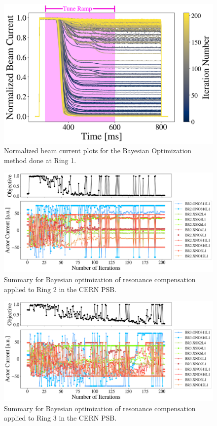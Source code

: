 \begin{figure}[H]
    \centering
    \includegraphics[width=\linewidth]{chapter5/i1_bo_commented.png}
    \caption{Normalized beam current plots for the Bayesian Optimization method done at Ring 1.}
    \label{fig:ibo}
\end{figure}

\begin{figure}[H]
    \centering
    \includegraphics[width=\linewidth]{chapter5/2023_05_02_R2_LHCramp_BayesOpt.png}
    \caption{Summary for Bayesian optimization of resonance compensation applied to Ring 2 in the CERN PSB.}
    \label{fig:bo1}
\end{figure}

\begin{figure}[H]
    \centering
    \includegraphics[width=\linewidth]{chapter5/2023_05_02_R3_LHCramp_BayesOpt.png}
    \caption{Summary for Bayesian optimization of resonance compensation applied to Ring 3 in the CERN PSB.}
    \label{fig:bo2}
\end{figure}

